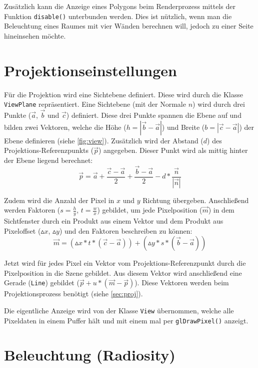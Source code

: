 \documentclass[final,a4paper,11pt,notitlepage,halfparskip]{scrreprt}
\begin{document}
Zusätzlich kann die Anzeige eines Polygons beim Renderprozess mittels der
Funktion \texttt{disable()} unterbunden werden. Dies ist nützlich, wenn man die
Beleuchtung eines Raumes mit vier Wänden berechnen will, jedoch zu einer Seite
hineinsehen möchte.

\section{Projektionseinstellungen}
Für die Projektion wird eine Sichtebene definiert. Diese wird durch die Klasse
\texttt{ViewPlane} repräsentiert. Eine Sichtebene (mit der Normale $n$) wird durch 
drei Punkte ($\vec{a}$, $\vec{b}$ und $\vec{c}$) definiert. Diese drei Punkte 
spannen die Ebene auf und bilden zwei Vektoren, welche die Höhe ($h = |\vec{b} - 
\vec{a}|$) und Breite ($b = |\vec{c} - \vec{a}|$) der Ebene definieren (siehe
\ref{fig:view}). Zusätzlich wird der Abstand ($d$) des 
Projektions-Referenzpunkts ($\vec{p}$) angegeben. Dieser Punkt wird als mittig 
hinter der Ebene liegend berechnet:
$$\vec{p} = \vec{a} + \frac{\vec{c} - \vec{a}}{2} + \frac{\vec{b} - \vec{a}}{2}
- d * \frac{\vec{n}}{|\vec{n}|}$$

Zudem wird die Anzahl der Pixel in $x$ und $y$ Richtung übergeben. Anschließend 
werden Faktoren ($s = \frac{h}{y}$, $t = \frac{w}{x}$) gebildet, um jede 
Pixelposition ($\vec{m}$) in dem Sichtfenster durch ein Produkt aus einem Vektor 
und dem Produkt aus Pixeloffset ($\vartriangle x$, $\vartriangle y$) und den 
Faktoren beschreiben zu können:
$$\vec{m} = (\vartriangle x * t * (\vec{c} - \vec{a})) + (\vartriangle y * s * 
(\vec{b} - \vec{a}))$$

Jetzt wird für jedes Pixel ein Vektor vom Projektions-Referenzpunkt durch die
Pixelposition in die Szene gebildet. Aus diesem Vektor wird anschließend eine
Gerade (\texttt{Line}) gebildet ($\vec{p} + u * (\vec{m} - \vec{p})$). Diese
Vektoren werden beim Projektionsprozess benötigt (siehe \ref{sec:proj}).

Die eigentliche Anzeige wird von der Klasse \texttt{View} übernommen, welche
alle Pixeldaten in einem Puffer hält und mit einem mal per 
\texttt{glDrawPixel()} anzeigt.

\section{Beleuchtung (Radiosity)}
\end{document}
